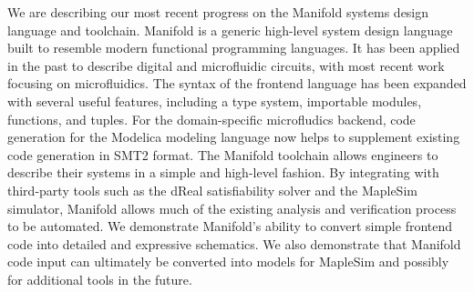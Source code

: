 We are describing our most recent progress on the Manifold systems design language and toolchain.
Manifold is a generic high-level system design language built to resemble modern functional programming languages.
It has been applied in the past to describe digital and microfluidic circuits, with most recent work focusing on microfluidics.
The syntax of the frontend language has been expanded with several useful features, including a type system, importable modules, functions, and tuples.
For the domain-specific microfludics backend, code generation for the Modelica modeling language now helps to supplement existing code generation in SMT2 format.
The Manifold toolchain allows engineers to describe their systems in a simple and high-level fashion.
By integrating with third-party tools such as the dReal satisfiability solver and the MapleSim simulator, Manifold allows much of the existing analysis and verification process to be automated.
We demonstrate Manifold's ability to convert simple frontend code into detailed and expressive schematics.
We also demonstrate that Manifold code input can ultimately be converted into models for MapleSim and possibly for additional tools in the future.
